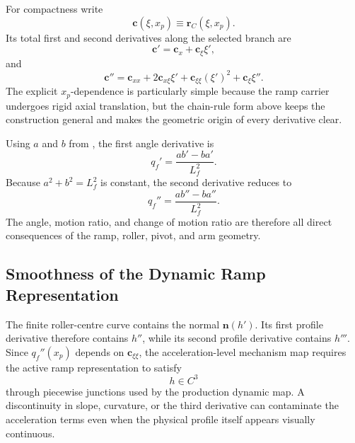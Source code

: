 \documentclass[11pt]{report}
\numberwithin{equation}{section}
\begin{document}
For compactness write
\begin{equation}
    \bm c(\xi,x_p)\equiv\bm r_C(\xi,x_p).
\end{equation}
Its total first and second derivatives along the selected branch are
\begin{equation}
    \boxed{
    \bm c'
    =
    \bm c_x
    +
    \bm c_\xi\xi',
    }
    \label{eq:appB_C_prime}
\end{equation}
and
\begin{equation}
    \boxed{
    \bm c''
    =
    \bm c_{xx}
    +2\bm c_{x\xi}\xi'
    +\bm c_{\xi\xi}(\xi')^2
    +\bm c_\xi\xi''.
    }
    \label{eq:appB_C_double_prime}
\end{equation}
The explicit \(x_p\)-dependence is particularly simple because the ramp carrier
undergoes rigid axial translation, but the chain-rule form above keeps the
construction general and makes the geometric origin of every derivative clear.

Using \(a\) and \(b\) from , the first angle derivative is
\begin{equation}
    \boxed{
    q_f'
    =
    \frac{ab'-ba'}{L_f^2}.
    }
    \label{eq:appB_q_prime}
\end{equation}
Because \(a^2+b^2=L_f^2\) is constant, the second derivative reduces to
\begin{equation}
    \boxed{
    q_f''
    =
    \frac{ab''-ba''}{L_f^2}.
    }
    \label{eq:appB_q_double_prime}
\end{equation}
The angle, motion ratio, and change of motion ratio are therefore all direct
consequences of the ramp, roller, pivot, and arm geometry.

\subsection{Smoothness of the Dynamic Ramp Representation}
\label{app:flyweight_ramp_smoothness}

The finite roller-centre curve contains the normal \(\bm n(h')\). Its first
profile derivative therefore contains \(h''\), while its second profile
derivative contains \(h'''\). Since \(q_f''(x_p)\) depends on
\(\bm c_{\xi\xi}\), the acceleration-level mechanism map requires the active
ramp representation to satisfy
\begin{equation}
    \boxed{h\in C^3}
    \label{eq:appB_ramp_C3}
\end{equation}
through piecewise junctions used by the production dynamic map. A discontinuity
in slope, curvature, or the third derivative can contaminate the acceleration
terms even when the physical profile itself appears visually continuous.
\end{document}

